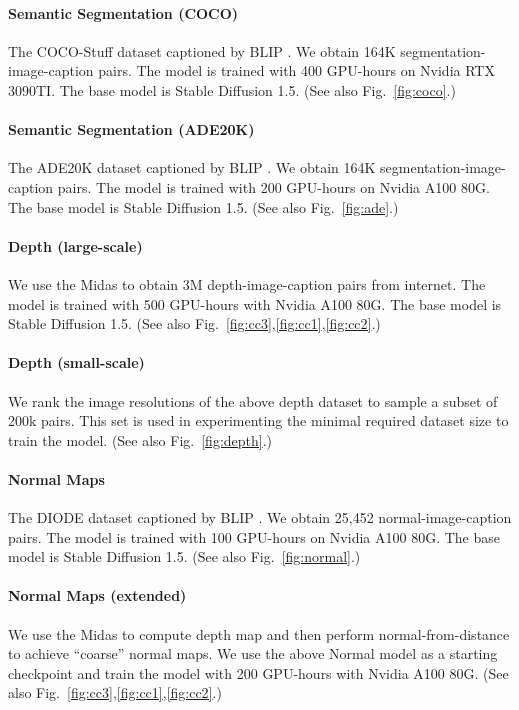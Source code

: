 \documentclass{article}
\begin{document}
\paragraph{Semantic Segmentation (COCO)} The COCO-Stuff dataset \cite{1612.03716} captioned by BLIP \cite{li2022blip}. We obtain 164K segmentation-image-caption pairs. The model is trained with 400 GPU-hours on Nvidia RTX 3090TI. The base model is Stable Diffusion 1.5. (See also Fig.~\ref{fig:coco}.)

\paragraph{Semantic Segmentation (ADE20K)} The ADE20K dataset \cite{8100027} captioned by BLIP \cite{li2022blip}. We obtain 164K segmentation-image-caption pairs. The model is trained with 200 GPU-hours on Nvidia A100 80G. The base model is Stable Diffusion 1.5. (See also Fig.~\ref{fig:ade}.)

\paragraph{Depth (large-scale)} We use the Midas \cite{DBLP:journals/corr/abs-1907-01341} to obtain 3M depth-image-caption pairs from internet. The model is trained with 500 GPU-hours with Nvidia A100 80G. The base model is Stable Diffusion 1.5. (See also Fig.~\ref{fig:cc3},\ref{fig:cc1},\ref{fig:cc2}.)

\paragraph{Depth (small-scale)} We rank the image resolutions of the above depth dataset to sample a subset of 200k pairs. This set is used in experimenting the minimal required dataset size to train the model. (See also Fig.~\ref{fig:depth}.)

\paragraph{Normal Maps} The DIODE dataset \cite{diode_dataset} captioned by BLIP \cite{li2022blip}. We obtain 25,452 normal-image-caption pairs. The model is trained with 100 GPU-hours on Nvidia A100 80G. The base model is Stable Diffusion 1.5. (See also Fig.~\ref{fig:normal}.)

\paragraph{Normal Maps (extended)} We use the Midas \cite{DBLP:journals/corr/abs-1907-01341} to compute depth map and then perform normal-from-distance to achieve ``coarse'' normal maps. We use the above Normal model as a starting checkpoint and train the model with 200 GPU-hours with Nvidia A100 80G. (See also Fig.~\ref{fig:cc3},\ref{fig:cc1},\ref{fig:cc2}.)
\end{document}
